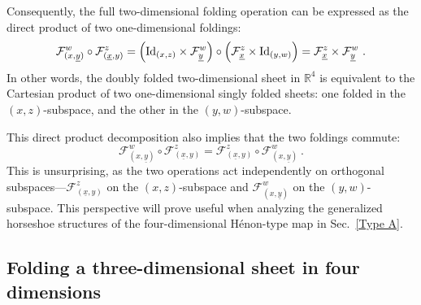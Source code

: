 \documentclass[12pt]{iopart}
\begin{document}
Consequently, the full two-dimensional folding operation can be expressed as the direct product of two one-dimensional foldings:
\begin{equation}\label{eq:folding decomposition into direct products}
\mathcal{F}^w_{(x,\underline{y})} \circ \mathcal{F}^z_{(\underline{x},y)}
= \left( {\rm Id}_{(x,z)} \times \mathcal{F}^w_{\underline{y}} \right) \circ \left( \mathcal{F}^z_{\underline{x}} \times {\rm Id}_{(y,w)} \right)
= \mathcal{F}^z_{\underline{x}} \times \mathcal{F}^w_{\underline{y}} \ .
\end{equation}
In other words, the doubly folded two-dimensional sheet in \( \mathbb{R}^4 \) is equivalent to the Cartesian product of two one-dimensional singly folded sheets: one folded in the \( (x,z) \)-subspace, and the other in the \( (y,w) \)-subspace. 

This direct product decomposition also implies that the two foldings commute:
\begin{equation}\label{eq:foldings commute}
\mathcal{F}^w_{(x,\underline{y})} \circ \mathcal{F}^z_{(\underline{x},y)} = \mathcal{F}^z_{(\underline{x},y)} \circ \mathcal{F}^w_{(x,\underline{y})}\ .
\end{equation}
This is unsurprising, as the two operations act independently on orthogonal subspaces—\( \mathcal{F}^z_{(\underline{x},y)} \) on the \( (x,z) \)-subspace and \( \mathcal{F}^w_{(x,\underline{y})} \) on the \( (y,w) \)-subspace. This perspective will prove useful when analyzing the generalized horseshoe structures of the four-dimensional Hénon-type map in Sec.~\ref{Type A}.




\subsection{Folding a three-dimensional sheet in four dimensions}
\label{Folding a three-dimensional sheet in four dimensions}
\end{document}
